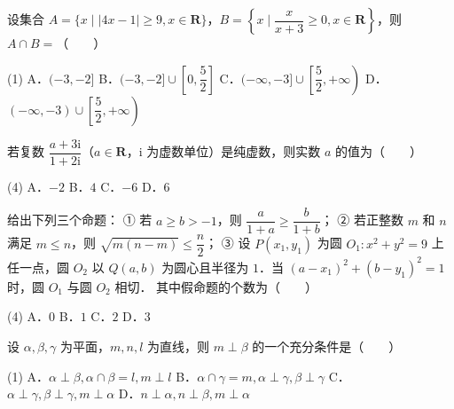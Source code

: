 

\begin{question}
设集合 $A = \{x \mid |4x - 1| \geqslant 9, x \in \mathbf{R}\}$，$B = \left\{x \mid \dfrac{x}{x+3} \geqslant 0, x \in \mathbf{R}\right\}$，则 $A \cap B =$\mbox{（　　）}

\begin{gkopts}(1)
\task A．$(-3, -2]$
\task B．$(-3, -2] \cup \left[0, \dfrac{5}{2}\right]$
\task C．$(-\infty, -3] \cup \left[\dfrac{5}{2}, +\infty\right)$
\task D．$(-\infty, -3) \cup \left[\dfrac{5}{2}, +\infty\right)$
\end{gkopts}

\end{question}
\begin{question}
若复数 $\dfrac{a+3\mathrm{i}}{1+2\mathrm{i}}$（$a \in \mathbf{R}$，$\mathrm{i}$ 为虚数单位）是纯虚数，则实数 $a$ 的值为\mbox{（　　）}

\begin{gkopts}(4)
\task A．$-2$
\task B．$4$
\task C．$-6$
\task D．$6$
\end{gkopts}

\end{question}
\begin{question}
给出下列三个命题：
① 若 $a \geqslant b > -1$，则 $\dfrac{a}{1+a} \geqslant \dfrac{b}{1+b}$；
② 若正整数 $m$ 和 $n$ 满足 $m \leqslant n$，则 $\sqrt{m(n-m)} \leqslant \dfrac{n}{2}$；
③ 设 $P(x_1, y_1)$ 为圆 $O_1: x^2 + y^2 = 9$ 上任一点，圆 $O_2$ 以 $Q(a, b)$ 为圆心且半径为 $1$．当 $(a - x_1)^2 + (b - y_1)^2 = 1$ 时，圆 $O_1$ 与圆 $O_2$ 相切．
其中假命题的个数为\mbox{（　　）}

\begin{gkopts}(4)
\task A．$0$
\task B．$1$
\task C．$2$
\task D．$3$
\end{gkopts}

\end{question}
\begin{question}
设 $\alpha, \beta, \gamma$ 为平面，$m, n, l$ 为直线，则 $m \perp \beta$ 的一个充分条件是\mbox{（　　）}

\begin{gkopts}(1)
\task A．$\alpha \perp \beta, \alpha \cap \beta = l, m \perp l$
\task B．$\alpha \cap \gamma = m, \alpha \perp \gamma, \beta \perp \gamma$
\task C．$\alpha \perp \gamma, \beta \perp \gamma, m \perp \alpha$
\task D．$n \perp \alpha, n \perp \beta, m \perp \alpha$
\end{gkopts}

\end{question}
